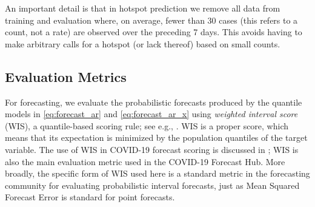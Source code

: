 \documentclass[9pt,twocolumn,twoside,lineno]{pnas-new}
\begin{document}
An important detail is that in hotspot prediction we remove all data from
training and evaluation where, on average, fewer than 30 cases (this refers to a
count, not a rate) are observed over the preceding 7 days. This avoids having to
make arbitrary calls for a hotspot (or lack thereof) based on small counts.   

\subsection{Evaluation Metrics}

For forecasting, we evaluate the probabilistic forecasts produced by the
quantile models in \eqref{eq:forecast_ar} and \eqref{eq:forecast_ar_x} using 
\textit{weighted interval score} (WIS), a quantile-based scoring rule; see e.g.,
\cite{Gneiting:2007}.  WIS is a proper score, which means that its expectation 
is minimized by the population quantiles of the target variable.  The use of WIS
in COVID-19 forecast scoring is discussed in \cite{Bracher:2021}; WIS is also
the main evaluation metric used in the COVID-19 Forecast Hub.
More broadly, the specific form of WIS used here is a standard metric in the
forecasting community for evaluating probabilistic interval forecasts, just as
Mean Squared Forecast Error is standard for point forecasts.
\end{document}
